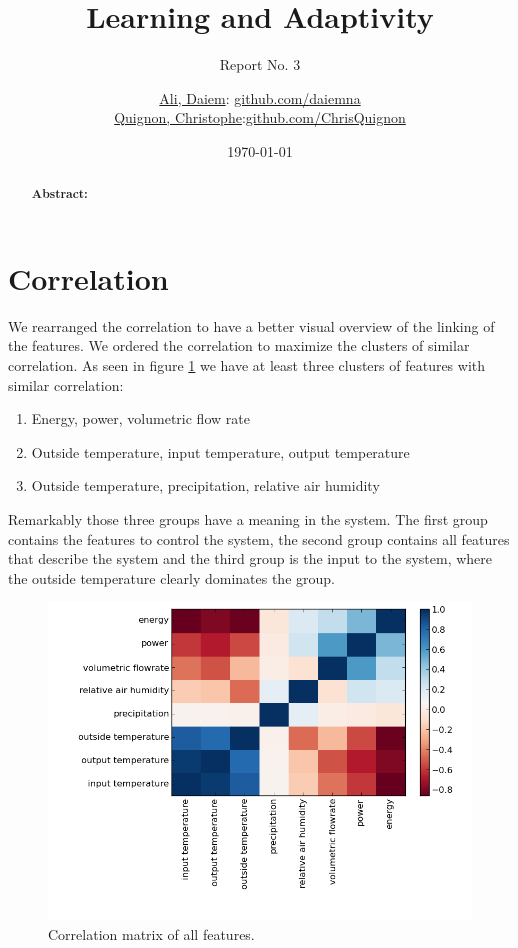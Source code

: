\documentclass{scrartcl}
\begin{document}
\title{Learning and Adaptivity}
\subtitle{Report No. 3}
\author{
  \href{daiem.ali@smail.inf.h-brs.de}{Ali, Daiem}: \href{https://github.com/daiemna}{github.com/daiemna}\\
  \href{christophe.quignon@smail.inf.h-brs.de}{Quignon, Christophe}:\href{https://github.com/ChrisQuignon}{github.com/ChrisQuignon}
}
\date{\today}


\maketitle



\begin{abstract}
\textbf{Abstract:}
\end{abstract}

\section{Correlation}
\label{sec:correlation}
We rearranged the correlation to have a better visual overview of the linking of the features. We ordered the correlation to maximize the clusters of similar correlation. As seen in figure \ref{fig:correlation} we have at least three clusters of features with similar correlation:

\begin{enumerate}
\item Energy, power, volumetric flow rate
\item Outside temperature, input temperature, output temperature
\item Outside temperature, precipitation, relative air humidity
\end{enumerate}

Remarkably those three groups have a meaning in the system. The first group contains the features to control the system, the second group contains all features that describe the system and the third group is the input to the system, where the outside temperature clearly dominates the group.

\begin{figure}[H]
  \centering
  \includegraphics[width=0.5\linewidth]{img/correlation.png}
  \caption{Correlation matrix of all features.}
  \label{fig:correlation}
\end{figure}
\end{document}
